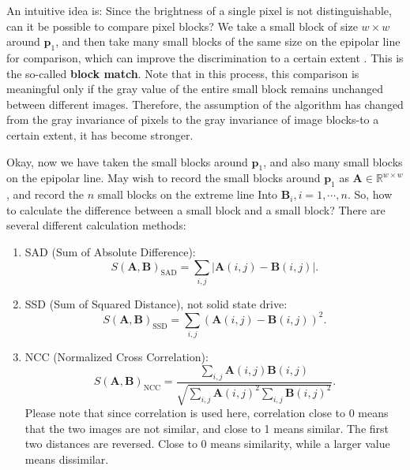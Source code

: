 An intuitive idea is: Since the brightness of a single pixel is not distinguishable, can it be possible to compare pixel blocks? We take a small block of size $w \times w$ around $\bm{p}_1$, and then take many small blocks of the same size on the epipolar line for comparison, which can improve the discrimination to a certain extent . This is the so-called \textbf{block match}. Note that in this process, this comparison is meaningful only if the gray value of the entire small block remains unchanged between different images. Therefore, the assumption of the algorithm has changed from the gray invariance of pixels to the gray invariance of image blocks-to a certain extent, it has become stronger.

Okay, now we have taken the small blocks around $\bm{p}_1$, and also many small blocks on the epipolar line. May wish to record the small blocks around $\bm{p}_1$ as $\bm{A} \in \mathbb{R}^{w \times w}$, and record the $n$ small blocks on the extreme line Into $\bm{B}_i, i=1, \cdots, n$. So, how to calculate the difference between a small block and a small block? There are several different calculation methods:

\begin{enumerate}
	\item SAD (Sum of Absolute Difference):
	\begin{equation}
		S( \bm{A}, \bm{B} )_{\mathrm{SAD}} = \sum_{i,j} | \bm{A}(i,j) - \bm{B}(i,j) |.
	\end{equation}
	\item SSD (Sum of Squared Distance), not solid state drive:
	\begin{equation}
		S( \bm{A}, \bm{B} )_{\mathrm{SSD}} = \sum_{i,j} \left( \bm{A}(i,j) - \bm{B}(i,j) \right)^2.
	\end{equation}
	\item NCC (Normalized Cross Correlation):
	\begin{equation}
		S( \bm{A}, \bm{B} )_{\mathrm{NCC}} = \frac{{\sum\limits_{i,j} {\bm{A}(i,j)\bm{B}(i,j)} }}{{\sqrt {\sum\limits_{i,j} {\bm{A}{{(i,j)}^2}\sum\limits_{i,j} {\bm{B}{{(i,j)}^2}} } } }}.
	\end{equation}
	Please note that since correlation is used here, correlation close to 0 means that the two images are not similar, and close to 1 means similar. The first two distances are reversed. Close to 0 means similarity, while a larger value means dissimilar.
\end{enumerate}

